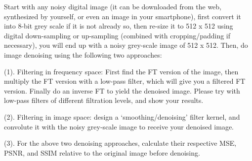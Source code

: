 \documentclass[12pt, a4paper, oneside]{ctexart}
\begin{document}
\begin{problem}

Start with any noisy digital image (it can be downloaded from the web, synthesized by yourself, or even an image in your smartphone), first convert it into 8-bit grey scale if it is not already so, then re-size it to 512 x 512 using digital down-sampling or up-sampling (combined with cropping/padding if necessary), you will end up with a noisy grey-scale image of 512 x 512. Then, do image denoising using the following two approaches:

(1). Filtering in frequency space: First find the FT version of the image, then multiply the FT version with a low-pass filter, which will give you a filtered FT version. Finally do an inverse FT to yield the denoised image.  Please try with low-pass filters of different filtration levels, and show your results.

(2). Filtering in image space: design a ‘smoothing/denoising’ filter kernel, and convolute it with the noisy grey-scale image to receive your denoised image.

(3). For the above two denoising approaches, calculate their respective MSE, PSNR, and SSIM relative to the original image before denoising.

\end{problem}
\end{document}
